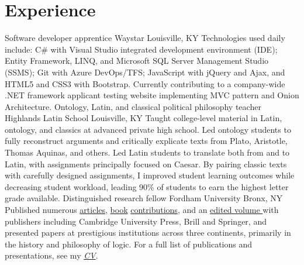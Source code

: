 \section{Experience}
{Software developer apprentice}
{Waystar}
{Louisville, KY}
{}
{Technologies used daily include: 
	C\# with Visual Studio integrated development environment (IDE); 
	Entity Framework, LINQ, and Microsoft SQL Server Management Studio (SSMS); 
	Git with Azure DevOps/TFS;  
	JavaScript with jQuery and Ajax, 
	and HTML5 and CSS3 with Bootstrap. 
	Currently contributing to a company-wide .NET framework applicant testing website implementing MVC pattern and Onion Architecture.}
{Ontology, Latin, and classical political philosophy teacher}
{Highlands Latin School}
{Louisville, KY}
{}
{Taught college-level material in Latin, ontology, and classics at advanced private high school. 
	Led ontology students to fully reconstruct arguments 
	and critically explicate texts from Plato, Aristotle, Thomas Aquinas, and others. 
	Led Latin students to translate both from and to Latin, 
	with assignments principally focused on Caesar. 
	By pairing classic texts with carefully designed assignments, 
	I improved student learning outcomes 
	while decreasing student workload, 
	leading 90\% of students to earn the highest letter grade available.}
{Distinguished research fellow}
{Fordham University}
{Bronx, NY}
{}
{Published numerous \href{https://fordham.academia.edu/jacobarchambault}{articles}, \href{https://www.collegepublications.co.uk/dialogues/?00005}{book} \href{https://www.cambridgescholars.com/hylomorphism-and-mereology}{contributions}, and an \href{https://brill.com/view/journals/viv/56/3-4/viv.56.issue-3-4.xml?language=en}{edited volume }
	with publishers including Cambridge University Press, Brill and Springer, 
	and presented papers at prestigious institutions across three continents, 
	primarily in the history and philosophy of logic. 
	For a full list of publications and presentations, see my 
	\href{https://jacobarchambault.com/curriculum-vitae}{\emph{CV}}.}
